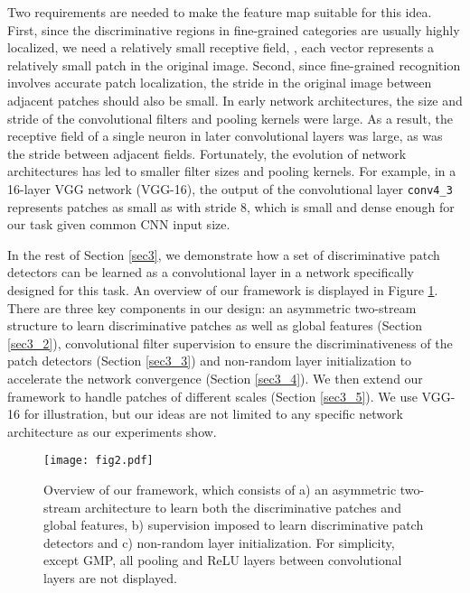 \documentclass[10pt,twocolumn,letterpaper]{article}
\begin{document}
Two requirements are needed to make the feature map suitable for this idea.
First, since the discriminative regions in fine-grained categories are usually highly localized, we need a relatively
small receptive field, \ie, each  vector represents a relatively small patch in the original image.
Second, since fine-grained recognition involves accurate patch localization, the stride in
the original image between adjacent
patches should also be small. In early network architectures, the size and stride of the
convolutional filters and pooling kernels were large. As a result, the receptive
field of a single neuron in later convolutional
layers was large, as was the stride between adjacent fields. Fortunately, the evolution of
network architectures \cite{vgg, googlenet, resnet} has led to smaller filter sizes and pooling kernels. For
example, in a 16-layer VGG network (VGG-16), the output of the  convolutional layer \texttt{conv4\_3}
represents patches as small as  with stride 8, which is small and dense enough for our task given common
CNN input size.

In the rest of Section \ref{sec3}, we demonstrate how a set of discriminative patch detectors can be
learned as a  convolutional layer in a network specifically designed for this task. An overview of our framework is
displayed in Figure \ref{fig2}. There are three key components in our design: an asymmetric
two-stream structure to learn discriminative patches as well as global features (Section \ref{sec3_2}), 
convolutional filter supervision to ensure the discriminativeness of the patch detectors (Section \ref{sec3_3}) and
non-random layer initialization to accelerate the network convergence (Section \ref{sec3_4}). We then extend our
framework to handle patches of different scales (Section \ref{sec3_5}). We use VGG-16 for illustration, but our ideas
are not limited to any specific network architecture as our experiments show.
\begin{figure}
\begin{center}
\texttt{[image: fig2.pdf]}
\end{center}
\vspace{-10pt}
\caption{\label{fig2} Overview of our framework, which consists of a) an asymmetric two-stream architecture to learn
both the discriminative patches and global features, b) supervision imposed to learn discriminative patch detectors and
c) non-random layer initialization. For simplicity, except GMP, all pooling and ReLU layers between
convolutional layers are not displayed.}
\end{figure}
\end{document}
